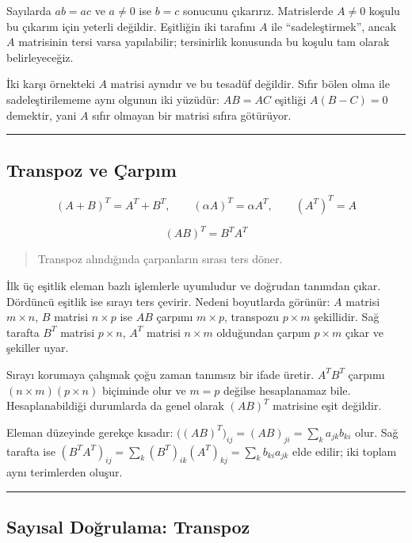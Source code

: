\documentclass[
  letterpaper,
  DIV=11,
  numbers=noendperiod]{scrartcl}
\begin{document}
Sayılarda \(ab=ac\) ve \(a\ne0\) ise \(b=c\) sonucunu çıkarırız.
Matrislerde \(A\ne0\) koşulu bu çıkarım için yeterli değildir. Eşitliğin
iki tarafını \(A\) ile ``sadeleştirmek'', ancak \(A\) matrisinin tersi
varsa yapılabilir; tersinirlik konusunda bu koşulu tam olarak
belirleyeceğiz.

İki karşı örnekteki \(A\) matrisi aynıdır ve bu tesadüf değildir. Sıfır
bölen olma ile sadeleştirilememe aynı olgunun iki yüzüdür: \(AB=AC\)
eşitliği \(A(B-C)=0\) demektir, yani \(A\) sıfır olmayan bir matrisi
sıfıra götürüyor.

\begin{center}\rule{0.5\linewidth}{0.5pt}\end{center}

\subsection{Transpoz ve Çarpım}\label{transpoz-ve-uxe7arpux131m}

\[
(A+B)^T=A^T+B^T,
\qquad
(\alpha A)^T=\alpha A^T,
\qquad
(A^T)^T=A
\]

\[
\boxed{(AB)^T=B^TA^T}
\]

\begin{quote}
Transpoz alındığında çarpanların sırası ters döner.
\end{quote}

İlk üç eşitlik eleman bazlı işlemlerle uyumludur ve doğrudan tanımdan
çıkar. Dördüncü eşitlik ise sırayı ters çevirir. Nedeni boyutlarda
görünür: \(A\) matrisi \(m\times n\), \(B\) matrisi \(n\times p\) ise
\(AB\) çarpımı \(m\times p\), transpozu \(p\times m\) şekillidir. Sağ
tarafta \(B^T\) matrisi \(p\times n\), \(A^T\) matrisi \(n\times m\)
olduğundan çarpım \(p\times m\) çıkar ve şekiller uyar.

Sırayı korumaya çalışmak çoğu zaman tanımsız bir ifade üretir.
\(A^TB^T\) çarpımı \((n\times m)(p\times n)\) biçiminde olur ve \(m=p\)
değilse hesaplanamaz bile. Hesaplanabildiği durumlarda da genel olarak
\((AB)^T\) matrisine eşit değildir.

Eleman düzeyinde gerekçe kısadır:
\(\bigl((AB)^T\bigr)_{ij}=(AB)_{ji}=\sum_k a_{jk}b_{ki}\) olur. Sağ
tarafta ise
\((B^TA^T)_{ij}=\sum_k (B^T)_{ik}(A^T)_{kj}=\sum_k b_{ki}a_{jk}\) elde
edilir; iki toplam aynı terimlerden oluşur.

\begin{center}\rule{0.5\linewidth}{0.5pt}\end{center}

\subsection{Sayısal Doğrulama:
Transpoz}\label{sayux131sal-doux11frulama-transpoz}
\end{document}
